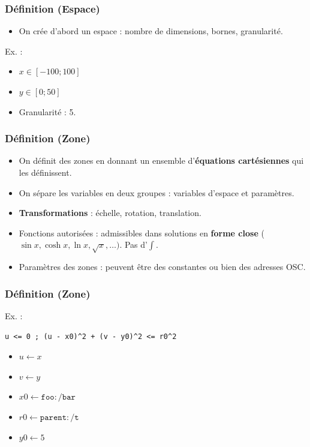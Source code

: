 \documentclass{beamer}
\begin{document}

\begin{frame}
    \frametitle{Définition (Espace)}\Large
    \begin{itemize}
        \item On crée d'abord un espace : nombre de dimensions, bornes, granularité.
    \end{itemize}
    
    Ex. : 
    \begin{itemize}
        \item $x \in [-100; 100]$
        \item $y \in [0; 50]$
        \item Granularité : 5.
    \end{itemize}
\end{frame}

\begin{frame}[fragile]
    \frametitle{Définition (Zone)}\Large
    \begin{itemize}
        \item On définit des zones en donnant un ensemble d'\textbf{équations cartésiennes} qui les définissent.
        \item On sépare les variables en deux groupes : variables d'espace et paramètres.
        \item \textbf{Transformations} : échelle, rotation, translation.
        \item Fonctions autorisées : admissibles dans solutions en \textbf{forme close} ($\sin x, \cosh x, \ln x, \sqrt x, \dots)$. Pas d'$\int$.
        \item Paramètres des zones : peuvent être des constantes ou bien des adresses OSC.
    \end{itemize}
    
\end{frame}

\begin{frame}[fragile]
    \frametitle{Définition (Zone)}\Large
    Ex. : 
    
    \begin{lstlisting}[columns=fullflexible]
    u <= 0 ; (u - x0)^2 + (v - y0)^2 <= r0^2     
    \end{lstlisting}
    \begin{itemize}
        \item $u \leftarrow x$
        \item $v \leftarrow y$
        \item $x0 \leftarrow \mathtt{foo:/bar}$
        \item $r0 \leftarrow \mathtt{parent:/t}$
        \item $y0 \leftarrow 5$
    \end{itemize}
\end{frame}
\end{document}
